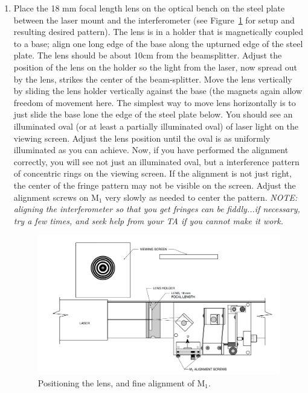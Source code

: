 \begin{enumerate}
	\item Place the 18 mm focal length lens on the optical bench on the steel plate between the laser mount and the
	interferometer (see Figure~\ref{mi:fig:positioning-lens} for setup and resulting desired pattern). The lens is in a holder that is magnetically coupled to a base; align one long edge of the base along the
	upturned edge of the steel plate. The lens should be about 10cm from the beamsplitter. Adjust the position of the lens
	on the holder so the light from the laser, now spread out by the lens, strikes the center of the beam-splitter. Move the
	lens vertically by sliding the lens holder vertically against the base (the magnets again allow freedom of movement
	here. The simplest way to move lens horizontally is to just slide the base lone the edge of the steel plate below. You
	should see an illuminated oval (or at least a partially illuminated oval) of laser light on the viewing screen. Adjust the
	lens position until the oval is as uniformly illuminated as you can achieve. Now, if you have performed the alignment
	correctly, you will see not just an illuminated oval, but a interference pattern of concentric rings on the viewing screen.
	If the alignment is not just right, the center of the fringe pattern may not be visible on the screen. Adjust the alignment
	screws on M$_1$ very slowly as needed to center the pattern. \textit{NOTE: aligning the interferometer so that you get fringes
	can be fiddly...if necessary, try a few times, and seek help from your TA if you cannot make it work.}

	\begin{figure}
		\centering
		\includegraphics[width=\textwidth]{michelson-interferometer/positioning-lens.png}
		\caption{Positioning the lens, and fine alignment of M$_1$.}\label{mi:fig:positioning-lens}
	\end{figure}

\end{enumerate}

